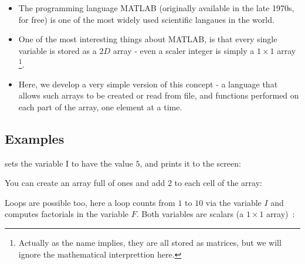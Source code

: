 
\begin{itemize}
\item The programming language MATLAB (originally available in the late
1970s, for free) is one of the most widely used scientific langaues in
the world.
\item One of the most interesting things about MATLAB, is that every
single variable is stored as a $2D$ array - even a scaler integer
is simply a $1\times1$ array \footnote{Actually as the name implies,
they are all stored as matrices, but we will ignore the mathematical
interprettion here.}.
\item Here, we develop a very simple version of this concept - a language
that allows such arrays to be created or read from file, and functions performed
on each part of the array, one element at a time.
\end{itemize}

\subsection*{Examples}




sets the variable I to have the value $5$, and prints it to the screen:





You can create an array full of ones and add $2$ to each cell of the array:





Loops are possible too, here a loop counts from $1$ to $10$ via the variable $I$ and computes factorials in the variable $F$. Both variables are scalars (a $1\times1$ array)~:


